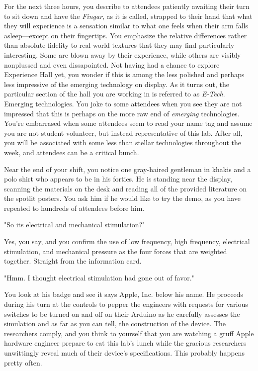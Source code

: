 \documentclass[../main.tex]{subfiles}
\begin{document}
For the next three hours, you describe to attendees patiently awaiting their turn to sit down and have the \textit{Fingar}, as it is called, strapped to their hand that what they will experience is a sensation similar to what one feels when their arm falls asleep---except on their fingertips. You emphasize the relative differences rather than absolute fidelity to real world textures that they may find particularly interesting. Some are blown away by their experience, while others are visibly nonplussed and even dissapointed. Not having had a chance to explore Experience Hall yet, you wonder if this is among the less polished and perhaps less impressive of the emerging technology on display. As it turns out, the particular section of the hall you are working in is referred to as \textit{E-Tech}. Emerging technologies. You joke to some attendees when you see they are not impressed that this is perhaps on the more raw end of \textit{emerging} technologies. You're embarrased when some attendees seem to read your name tag and assume you are not student volunteer, but instead representative of this lab. After all, you will be associated with some less than stellar technologies throughout the week, and attendees can be a critical bunch.

Near the end of your shift, you notice one gray-haired gentleman in khakis and a polo shirt who appears to be in his forties. He is standing near the display, scanning the materials on the desk and reading all of the provided literature on the spotlit posters. You ask him if he would like to try the demo, as you have repeated to hundreds of attendees before him.

"So its electrical and mechanical stimulation?"

Yes, you say, and you confirm the use of low frequency, high frequency, electrical stimulation, and mechanical pressure as the four forces that are weighted together. Straight from the information card.

"Hmm. I thought electrical stimulation had gone out of favor."

You look at his badge and see it says Apple, Inc. below his name. He proceeds during his turn at the controls to pepper the engineers with requests for various switches to be turned on and off on their Arduino as he carefully assesses the simulation and as far as you can tell, the construction of the device.  The researchers comply, and you think to yourself that you are watching a gruff Apple hardware engineer prepare to eat this lab's lunch while the gracious researchers unwittingly reveal much of their device's specifications. This probably happens pretty often.
\end{document}
